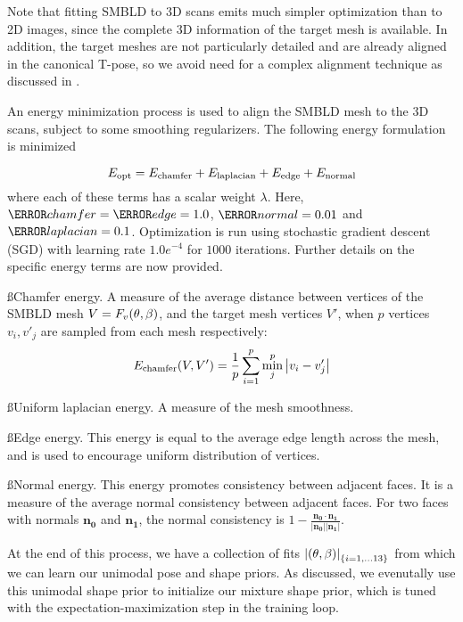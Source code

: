 Note that fitting SMBLD to 3D scans emits much simpler optimization than to 2D images, since the complete 3D information of the target mesh is available. In addition, the target meshes are not particularly detailed and are already aligned in the canonical T-pose, so we avoid need for a complex alignment technique as discussed in . 

An energy minimization process is used to align the SMBLD mesh to the 3D scans, subject to some smoothing regularizers. The following energy formulation is minimized

\begin{equation}
    E_\textrm{opt} = E_\textrm{chamfer} + E_\textrm{laplacian} + E_\textrm{edge} + E_\textrm{normal}
\end{equation}
where each of these terms has a scalar weight $\lambda$. Here, $\W{chamfer}=\W{edge}=1.0$, $\W{normal}=0.01$ and $\W{laplacian}=0.1$. Optimization is run using stochastic gradient descent (SGD) with learning rate $1.0e^{-4}$ for $1000$ iterations. Further details on the specific energy terms are now provided.

\ss{Chamfer energy.} A measure of the average distance between vertices of the SMBLD mesh $V=F_v(\theta, \beta)$, and the target mesh vertices $V'$, when $p$ vertices $v_{i}, v'_{j}$ are sampled from each mesh respectively:
\begin{equation}
        E_\textrm{chamfer}(V, V') = \frac{1}{p} \sum_{i=1}^p \min_j^p  \left | v_{i} - v'_{j} \right |
\end{equation}

\ss{Uniform laplacian energy.} A measure of the mesh smoothness.

\ss{Edge energy.} This energy is equal to the average edge length across the mesh, and is used to encourage uniform distribution of vertices.

\ss{Normal energy.} This energy promotes consistency between adjacent faces. It is a measure of the average normal consistency between adjacent faces. For two faces with normals $\mathbf{n_0}$ and $\mathbf{n_1}$, the normal consistency is $1 - \frac{\mathbf{n_0} \cdot \mathbf{n_1}}{\left|\mathbf{n_0}\right|\left|\mathbf{n_1}\right|}$.

At the end of this process, we have a collection of fits $\left|(\theta,\beta)\right|_{\{i=1,...13\}}$ from which we can learn our unimodal pose and shape priors. As discussed, we evenutally use this unimodal shape prior to initialize our mixture shape prior, which is tuned with the expectation-maximization step in the training loop.



